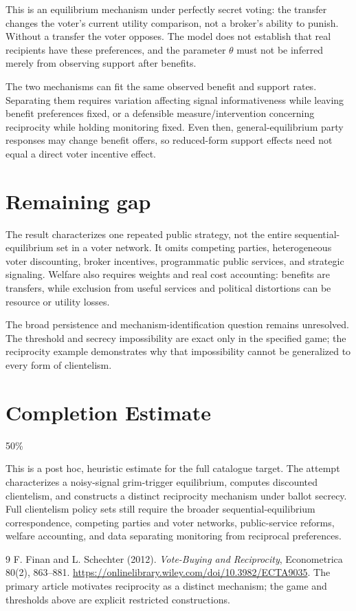 \documentclass[11pt,a4paper]{article}
\begin{document}
This is an equilibrium mechanism under perfectly secret voting: the transfer changes the voter's current utility comparison, not a broker's ability to punish. Without a transfer the voter opposes. The model does not establish that real recipients have these preferences, and the parameter $\theta$ must not be inferred merely from observing support after benefits.

The two mechanisms can fit the same observed benefit and support rates. Separating them requires variation affecting signal informativeness while leaving benefit preferences fixed, or a defensible measure/intervention concerning reciprocity while holding monitoring fixed. Even then, general-equilibrium party responses may change benefit offers, so reduced-form support effects need not equal a direct voter incentive effect.
\section{Remaining gap}
The result characterizes one repeated public strategy, not the entire sequential-equilibrium set in a voter network. It omits competing parties, heterogeneous voter discounting, broker incentives, programmatic public services, and strategic signaling. Welfare also requires weights and real cost accounting: benefits are transfers, while exclusion from useful services and political distortions can be resource or utility losses.

The broad persistence and mechanism-identification question remains unresolved. The threshold and secrecy impossibility are exact only in the specified game; the reciprocity example demonstrates why that impossibility cannot be generalized to every form of clientelism.

\section{Completion Estimate}
50\%

This is a post hoc, heuristic estimate for the full catalogue target.
The attempt characterizes a noisy-signal grim-trigger equilibrium, computes discounted clientelism, and constructs a distinct reciprocity mechanism under ballot secrecy. Full clientelism policy sets still require the broader sequential-equilibrium correspondence, competing parties and voter networks, public-service reforms, welfare accounting, and data separating monitoring from reciprocal preferences.

\begin{thebibliography}{9}
 F. Finan and L. Schechter (2012).
\emph{Vote-Buying and Reciprocity}, Econometrica 80(2), 863--881.
\url{https://onlinelibrary.wiley.com/doi/10.3982/ECTA9035}.
The primary article motivates reciprocity as a distinct mechanism; the game and thresholds above are explicit restricted constructions.
\end{thebibliography}
\end{document}
